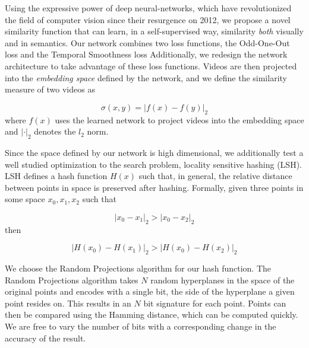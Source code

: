 Using the expressive power of deep neural-networks, which have revolutionized the field of computer vision since their resurgence on 2012, we propose a novel similarity function that can learn, in a self-supervised way, similarity \textit{both} visually and in semantics. Our network combines two loss functions, the Odd-One-Out loss \cite{fernando2017self} and the Temporal Smoothness loss \cite{goroshin2015unsupervised, jayaraman2016slow} Additionally, we redesign the network architecture to take advantage of these loss functions. Videos are then projected into the \textit{embedding space} defined by the network, and we define the similarity measure of two videos as 

\begin{equation*}
\sigma(x, y) =|f(x) - f(y)|_2
\end{equation*}
where $f(x)$ uses the learned network to project videos into the embedding space and $|\cdot|_2$ denotes the $l_2$ norm. 

Since the space defined by our network is high dimensional, we additionally test a well studied optimization to the search problem, locality sensitive hashing (LSH). LSH defines a hash function $H(x)$ such that, in general, the relative distance between points in space is preserved after hashing. Formally, given three points in some space $x_0, x_1, x_2$ such that 

\begin{equation*}
|x_0 - x_1|_2 > |x_0 - x_2|_2
\end{equation*}
then

\begin{equation*}
|H(x_0) - H(x_1)|_2 > |H(x_0) - H(x_2)|_2
\end{equation*}

We choose the Random Projections algorithm \cite{charikar2002similarity} for our hash function. The Random Projections algorithm takes $N$ random hyperplanes in the space of the original points and encodes with a single bit, the side of the hyperplane a given point resides on. This results in an $N$ bit signature for each point. Points can then be compared using the Hamming distance, which can be computed quickly. We are free to vary the number of bits with a corresponding change in the accuracy of the result.
